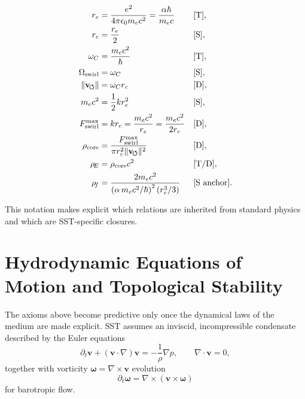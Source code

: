 \documentclass[10pt]{article}
\begin{document}
        \begin{align}
            r_e &= \frac{e^2}{4\pi\epsilon_0 m_e c^2} = \frac{\alpha\hbar}{m_e c}
            && \text{[T]},\\
            r_c &= \frac{r_e}{2}
            && \text{[S]},\\
            \omega_C &= \frac{m_e c^2}{\hbar}
            && \text{[T]},\\
            \Omega_{\text{swirl}} &= \omega_C
            && \text{[S]},\\
            \lVert \mathbf{v}_{\!\boldsymbol{\circlearrowleft}}\rVert &= \omega_C r_c
            && \text{[D]},\\
            m_e c^2 &= \frac12 k r_e^2
            && \text{[S]},\\
            F_{\text{swirl}}^{\max} &= kr_c=\frac{m_e c^2}{r_e}=\frac{m_e c^2}{2r_c}
            && \text{[D]},\\
            \rho_{\text{core}} &= \frac{F_{\text{swirl}}^{\max}}{\pi r_c^2 \lVert \mathbf{v}_{\!\boldsymbol{\circlearrowleft}}\rVert^2}
            && \text{[D]},\\
            \rho_{\!E} &= \rho_{\text{core}}c^2
            && \text{[T/D]},\\
            \rho_{\!f} &=
            \frac{2 m_e c^2}{
                \left(\alpha \, m_e c^2/\hbar\right)^2 \left(r_e^3/3\right)}
            && \text{[S anchor]}.
        \end{align}

        This notation makes explicit which relations are inherited from standard physics and which are SST-specific closures.

    \section{Hydrodynamic Equations of Motion and Topological Stability}
        \label{sec:hydroEOM}

        The axioms above become predictive only once the dynamical laws of the medium are
        made explicit. SST assumes an inviscid, incompressible condensate described by the
        Euler equations
        \begin{equation}
            \partial_t \mathbf{v} + (\mathbf{v}\cdot\nabla)\mathbf{v}
            = -\frac{1}{\rho}\nabla p,
            \qquad
            \nabla\cdot\mathbf{v}=0,
        \end{equation}
        together with vorticity $\boldsymbol{\omega}=\nabla\times\mathbf{v}$ evolution
        \begin{equation}
            \partial_t \boldsymbol{\omega} = \nabla\times(\mathbf{v}\times\boldsymbol{\omega})
        \end{equation}
        for barotropic flow.
\end{document}

